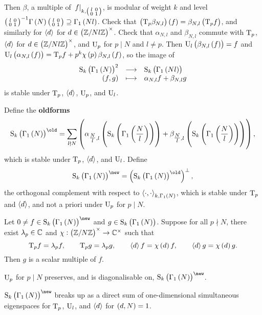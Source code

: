 \pagebreak

Then $ \beta $, a multiple of $ \left. f \right|_{k, \begin{psmallmatrix} l & 0 \\ 0 & 1 \end{psmallmatrix}} $, is modular of weight $ k $ and level $ \twobytwosmall{l}{0}{0}{1}^{-1}\Gamma\br{N}\twobytwosmall{l}{0}{0}{1} \supseteq \Gamma_1\br{Nl} $. Check that $ \br{\T_p\beta_{N, l}}\br{f} = \beta_{N, l}\br{\T_pf} $, and similarly for $ \left\langle d \right\rangle $ for $ d \in \br{\ZZ / Nl\ZZ}^\times $. Check that $ \alpha_{N, l} $ and $ \beta_{N, l} $ commute with $ \mathrm{T}_p $, $ \left\langle d \right\rangle $ for $ d \in \br{\ZZ / Nl\ZZ}^\times $, and $ \mathrm{U}_p $ for $ p \mid N $ and $ l \ne p $. Then $ \U_l\br{\beta_{N, l}\br{f}} = f $ and $ \U_l\br{\alpha_{N, l}\br{f}} = \T_pf + p^k\chi\br{p}\beta_{N, l}\br{f} $, so the image of
$$ \function{\S_k\br{\Gamma_1\br{N}}^2}{\S_k\br{\Gamma_1\br{Nl}}}{\br{f, g}}{\alpha_{N, l}f + \beta_{N, l}g} $$
is stable under $ \mathrm{T}_p $, $ \left\langle d \right\rangle $, $ \mathrm{U}_p $, and $ \mathrm{U}_l $.

\begin{definition}
Define the \textbf{oldforms}
$$ \S_k\br{\Gamma_1\br{N}}^{\old} = \sum_{l \nmid N} \br{\alpha_{\tfrac{N}{l}, l}\br{\S_k\br{\Gamma_1\br{\dfrac{N}{l}}}} + \beta_{\tfrac{N}{l}, l}\br{\S_k\br{\Gamma_1\br{\dfrac{N}{l}}}}}, $$
which is stable under $ \mathrm{T}_p $, $ \left\langle d \right\rangle $, and $ \mathrm{U}_l $. Define
$$ \S_k\br{\Gamma_1\br{N}}^{\new} = \br{\S_k\br{\Gamma_1\br{N}}^{\old}}^\perp, $$
the orthogonal complement with respect to $ \abr{\cdot, \cdot}_{k, \Gamma_1\br{N}} $, which is stable under $ \mathrm{T}_p $ and $ \left\langle d \right\rangle $, and not a priori under $ \mathrm{U}_p $ for $ p \mid N $.
\end{definition}

\begin{theorem}
Let $ 0 \ne f \in \S_k\br{\Gamma_1\br{N}}^{\new} $ and $ g \in \S_k\br{\Gamma_1\br{N}} $. Suppose for all $ p \nmid N $, there exist $ \lambda_p \in \mathbb{C} $ and $ \chi : \br{\ZZ / N\ZZ}^\times \to \CC^\times $ such that
$$ \T_pf = \lambda_pf, \qquad \T_pg = \lambda_pg, \qquad \abr{d}f = \chi\br{d}f, \qquad \abr{d}g = \chi\br{d}g. $$
Then $ g $ is a scalar multiple of $ f $.
\end{theorem}

\begin{corollary}
$ \mathrm{U}_p $ for $ p \mid N $ preserves, and is diagonalisable on, $ \S_k\br{\Gamma_1\br{N}}^{\new} $.
\end{corollary}

\begin{corollary}
$ \S_k\br{\Gamma_1\br{N}}^{\new} $ breaks up as a direct sum of one-dimensional simultaneous eigenspaces for $ \mathrm{T}_p $, $ \mathrm{U}_l $, and $ \left\langle d \right\rangle $ for $ \br{d, N} = 1 $.
\end{corollary}


